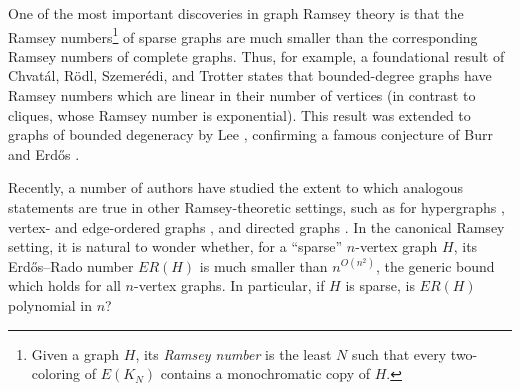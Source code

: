 \documentclass[a4paper,11pt]{article}
\theoremstyle{definition}
\begin{document}
One of the most important discoveries in graph Ramsey theory is that the Ramsey numbers\footnote{Given a graph $H$, its \emph{Ramsey number} is the least $N$ such that every two-coloring of $E(K_N)$ contains a monochromatic copy of $H$.} of sparse graphs are much smaller than the corresponding Ramsey numbers of complete graphs. Thus, for example, a foundational result of Chvat\'al, R\"odl, Szemer\'edi, and Trotter \cite{MR714447} states that bounded-degree graphs have Ramsey numbers which are linear in their number of vertices (in contrast to cliques, whose Ramsey number is exponential). This result was extended to graphs of bounded degeneracy by Lee \cite{MR3664811}, confirming a famous conjecture of Burr and Erd\H os \cite{MR0371701}.

Recently, a number of authors have studied the extent to which analogous statements are true in other Ramsey-theoretic settings, such as for hypergraphs \cite{MR2532871,MR2520273,MR2410941, FSSTZ23}, vertex- and edge-ordered graphs \cite{MR4170446,MR3575208,MR4057168}, and directed graphs \cite{FHW,MR2793448}. In the canonical Ramsey setting, it is natural to wonder whether, for a ``sparse'' $n$-vertex graph $H$, its Erd\H os--Rado number $ER(H)$ is much smaller than $n^{O(n^2)}$, the generic bound which holds for all $n$-vertex graphs. In particular, if $H$ is sparse, is $ER(H)$ polynomial in $n$?
\end{document}
